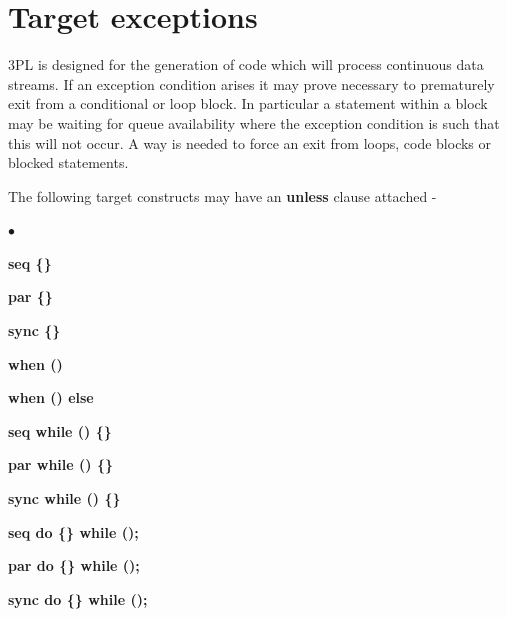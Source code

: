 \documentclass[10pt,a4paper,twoside,fleqn]{article}
\newcommand{\blist}{\begin{list}{$\bullet$}{\setlength{\itemsep}{-5pt}\setlength{\topsep}{-5pt}}}
\newcommand{\blend}{\end{list}}
\begin{document}
    


\section{Target exceptions}

    3PL is designed for the generation of code which will process continuous
    data streams. If an exception condition arises it may prove necessary to
    prematurely exit from a conditional or loop block. In particular a
    statement within a block may be waiting for queue availability where
    the exception condition is such that this will not occur. A way is
    needed to force an exit from loops, code blocks or blocked statements.
    
    The following target constructs may have an {\bf unless} clause attached -
    \blist
    \item   {\bf seq \{\}}
    \item   {\bf par \{\}}
    \item   {\bf sync \{\}}
    \item   {\bf when ()}
    \item   {\bf when () else}
    \item   {\bf seq while () \{\}}
    \item   {\bf par while () \{\}}
    \item   {\bf sync while () \{\}}
    \item   {\bf seq do \{\} while ();}
    \item   {\bf par do \{\} while ();}
    \item   {\bf sync do \{\} while ();}
    \blend
    
\end{document}
